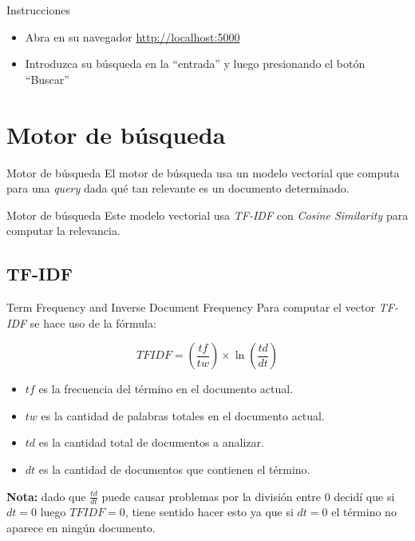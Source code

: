 \documentclass{beamer}
\begin{document}
\begin{frame}{Instrucciones}
  \begin{itemize}
    \item Abra en su navegador \href{http://localhost:5000}{http://localhost:5000}
    \item Introduzca su b\'usqueda en la ``entrada'' y luego presionando el bot\'on
          ``Buscar''
  \end{itemize}
\end{frame}

\section*{Motor de b\'usqueda}

\begin{frame}{Motor de b\'usqueda}
  El motor de búsqueda usa un modelo vectorial que computa para una {\it query}
  dada qué tan relevante es un documento determinado.
\end{frame}

\begin{frame}{Motor de b\'usqueda}
  Este modelo vectorial usa
    {\it TF-IDF} con {\it Cosine
      Similarity} para computar la relevancia.
\end{frame}

\subsection*{TF-IDF}

\begin{frame}{Term Frequency and Inverse Document Frequency}
  Para computar el vector {\it TF-IDF}
  se hace uso de la fórmula:

  \begin{equation}
    TFIDF = (\frac{tf}{tw}) \times \ln(\frac{td}{dt}) \nonumber
  \end{equation}

  \begin{itemize}
    \item $tf$ es la frecuencia del término en el documento actual.
    \item $tw$ es la cantidad de palabras totales en el documento actual.
    \item $td$ es la cantidad total de documentos a analizar.
    \item $dt$ es la cantidad de documentos que contienen el término.
  \end{itemize}

  \pause

  {\bf \color{red} Nota:} dado que $\frac{td}{dt}$ puede causar problemas por la
  división entre $0$ decidí que si $dt = 0$ luego $TFIDF = 0$, tiene sentido hacer esto ya
  que si $dt = 0$ el término no aparece en ningún documento.
\end{frame}
\end{document}
